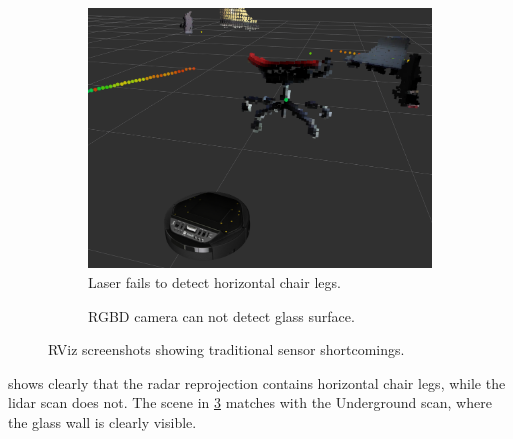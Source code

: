 \begin{figure}
    \begin{subfigure}[t]{.485\textwidth}
        \centering
        \includegraphics[max width=\textwidth]{gfx/screenshots/chair_laser_vs_rgbd}
        \caption{Laser fails to detect horizontal chair legs.}
        \label{fig:lidar_rgbd2}
    \end{subfigure}%
    \hfill%
    \begin{subfigure}[t]{.485\textwidth}
        \centering
        \def\svgwidth{\linewidth}
        
        \caption{RGBD camera can not detect glass surface.}
        \label{fig:rgbd_glasswall2}
    \end{subfigure}%
    \caption{RViz screenshots showing traditional sensor shortcomings.}
\end{figure}

 shows clearly that the radar reprojection contains horizontal chair legs, while the lidar scan does not. The scene in \cref{fig:rgbd_glasswall2} matches with the Underground scan, where the glass wall is clearly visible.

